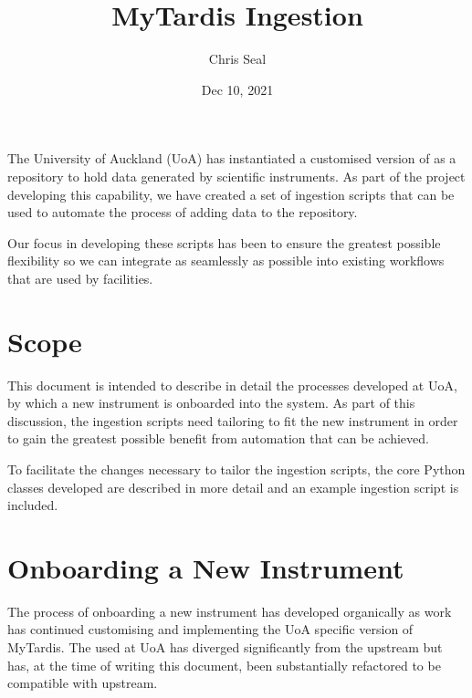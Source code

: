 \documentclass[letterpaper,10pt,english]{sphinxmanual}
\title{MyTardis Ingestion}
\date{Dec 10, 2021}
\author{Chris Seal}
\begin{document}
\pagestyle{empty}
\sphinxmaketitle
\pagestyle{plain}
\sphinxtableofcontents
\pagestyle{normal}
\label{\detokenize{index::doc}}


\sphinxAtStartPar
The University of Auckland (UoA) has instantiated a customised version of  as a repository to hold data generated by scientific instruments. As part of the project developing this capability, we have created a set of ingestion scripts that can be used to automate the process of adding data to the repository.

\sphinxAtStartPar
Our focus in developing these scripts has been to ensure the greatest possible flexibility so we can integrate as seamlessly as possible into existing workflows that are used by facilities.


\chapter{Scope}
\label{\detokenize{index:scope}}
\sphinxAtStartPar
This document is intended to describe in detail the processes developed at UoA, by which a new instrument is onboarded into the system. As part of this discussion, the ingestion scripts need tailoring to fit the new instrument in order to gain the greatest possible benefit from automation that can be achieved.

\sphinxAtStartPar
To facilitate the changes necessary to tailor the ingestion scripts, the core Python classes developed are described in more detail and an example ingestion script is included.


\chapter{Onboarding a New Instrument}
\label{\detokenize{index:onboarding-a-new-instrument}}
\sphinxAtStartPar
The process of onboarding a new instrument has developed organically as work has continued customising and implementing the UoA specific version of MyTardis. The  used at UoA has diverged significantly from the upstream but has, at the time of writing this document, been substantially refactored to be compatible with upstream.
\end{document}
